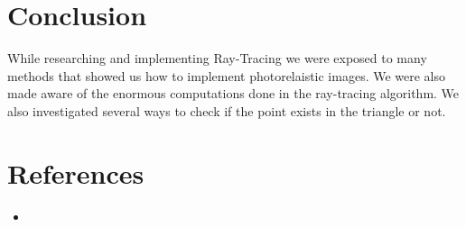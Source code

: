 \documentclass[paper=a4, fontsize=11pt]{scrartcl}
\numberwithin{equation}{section}		%
\numberwithin{figure}{section}			%
\numberwithin{table}{section}				%
\begin{document}
\section{Conclusion}
While researching and implementing Ray-Tracing we were exposed to many methods that showed us how to implement photorelaistic images. We were also made aware of the enormous computations done in the ray-tracing algorithm. We also investigated several ways to check if the point exists in the triangle or not.

\section{References}
\begin{itemize}
\item 
\end{itemize}

\end{document}
